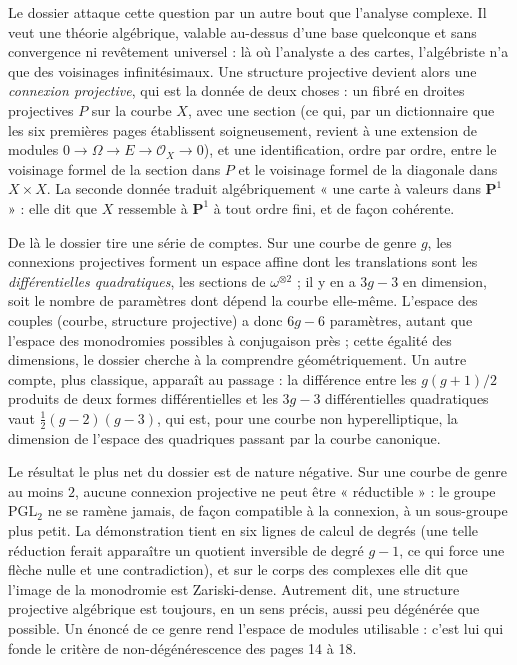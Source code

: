 \documentclass[11pt,a4paper]{article}
\begin{document}
\begin{resume}
Le dossier attaque cette question par un autre bout que l'analyse complexe.
Il veut une théorie algébrique, valable
au-dessus d'une base quelconque et sans convergence ni revêtement universel :
là où l'analyste a des cartes, l'algébriste n'a que des voisinages
infinitésimaux. Une structure projective devient alors une
\emph{connexion projective}, qui est la donnée de deux choses : un fibré en
droites projectives $P$ sur la courbe $X$, avec une section (ce qui, par un
dictionnaire que les six premières pages établissent soigneusement, revient à
une extension de modules $0 \to \Omega \to E \to \mathcal{O}_X \to 0$), et une
identification, ordre par ordre, entre le voisinage formel de la section dans
$P$ et le voisinage formel de la diagonale dans $X \times X$. La seconde donnée
traduit algébriquement « une carte à valeurs dans
$\mathbf{P}^1$ » : elle dit que $X$ ressemble à $\mathbf{P}^1$ à tout ordre
fini, et de façon cohérente.

De là le dossier tire une série de comptes. Sur une courbe de genre $g$, les
connexions projectives forment un espace affine dont les translations sont les
\emph{différentielles quadratiques}, les sections de $\omega^{\otimes 2}$ ;
il y en a $3g-3$ en dimension, soit le nombre de paramètres dont dépend
la courbe elle-même. L'espace des couples (courbe, structure projective) a
donc $6g-6$ paramètres, autant que l'espace des monodromies possibles à
conjugaison près ; cette égalité des dimensions, le dossier cherche à la
comprendre géométriquement. Un autre compte,
plus classique, apparaît au passage : la différence entre les
$g(g+1)/2$ produits de deux formes différentielles et les $3g-3$
différentielles quadratiques vaut $\tfrac12 (g-2)(g-3)$, qui est, pour une
courbe non hyperelliptique, la dimension de l'espace des quadriques passant
par la courbe canonique.

Le résultat le plus net du dossier est de nature négative. Sur une courbe de genre au moins $2$, aucune connexion projective ne
peut être « réductible » : le groupe $\mathrm{PGL}_2$ ne se ramène jamais,
de façon compatible à la connexion, à un sous-groupe plus petit. La
démonstration tient en six lignes de calcul de degrés (une telle réduction
ferait apparaître un quotient inversible de degré $g-1$, ce qui force une
flèche nulle et une contradiction), et sur le corps des complexes elle dit
que l'image de la monodromie est Zariski-dense. Autrement dit, une structure
projective algébrique est toujours, en un sens précis, aussi peu dégénérée que
possible. Un énoncé de ce genre rend l'espace de modules utilisable : c'est
lui qui fonde le critère de non-dégénérescence des pages 14 à 18.


\end{resume}
\end{document}
